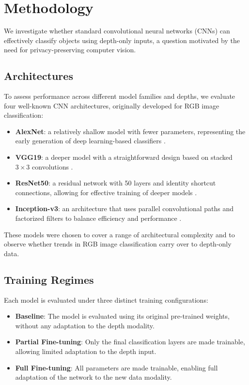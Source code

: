 \section{Methodology}

We investigate whether standard convolutional neural networks (CNNs) can effectively classify objects using depth-only inputs, a question motivated by the need for privacy-preserving computer vision.

\subsection{Architectures}

To assess performance across different model families and depths, we evaluate four well-known CNN architectures, originally developed for RGB image classification:

\begin{itemize}
    \item \textbf{AlexNet}: a relatively shallow model with fewer parameters, representing the early generation of deep learning-based classifiers \cite{alexnet}.
    \item \textbf{VGG19}: a deeper model with a straightforward design based on stacked $3 \times 3$ convolutions \cite{vgg19}.
    \item \textbf{ResNet50}: a residual network with 50 layers and identity shortcut connections, allowing for effective training of deeper models \cite{resnet50}.
    \item \textbf{Inception-v3}: an architecture that uses parallel convolutional paths and factorized filters to balance efficiency and performance \cite{inceptionv3}.
\end{itemize}

These models were chosen to cover a range of architectural complexity and to observe whether trends in RGB image classification carry over to depth-only data.

\subsection{Training Regimes}

Each model is evaluated under three distinct training configurations:
\begin{itemize}
    \item \textbf{Baseline}: The model is evaluated using its original pre-trained weights, without any adaptation to the depth modality.
    \item \textbf{Partial Fine-tuning}: Only the final classification layers are made trainable, allowing limited adaptation to the depth input.
    \item \textbf{Full Fine-tuning}: All parameters are made trainable, enabling full adaptation of the network to the new data modality.
\end{itemize}

